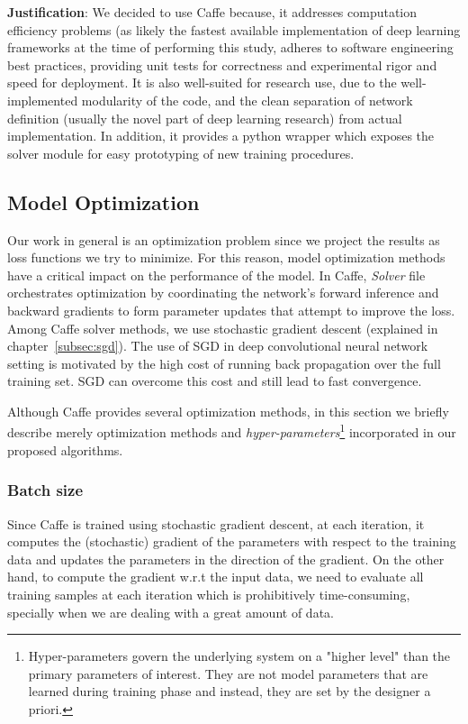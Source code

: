 \textbf{Justification}: We decided to use Caffe because, it addresses computation efficiency problems (as likely the fastest available implementation of deep learning frameworks at the time of performing this study, adheres to software engineering best practices, providing unit tests for correctness and experimental rigor and speed for deployment. It is also well-suited for research use, due to the well-implemented modularity of the code, and the clean separation of network definition (usually the novel part of deep learning research) from actual implementation\cite{jia2014caffe}. In addition, it provides a python wrapper which exposes the solver module for easy prototyping of new training procedures. 

\subsection{Model Optimization}

Our work in general is an optimization problem since we project the results as loss functions we try to minimize. For this reason, model optimization methods have a critical impact on the performance of the model. In Caffe, \textit{Solver} file orchestrates optimization by coordinating the network's forward inference and backward gradients to form parameter updates that attempt to improve the loss. Among Caffe solver methods, we use stochastic gradient descent (explained in chapter~\ref{subsec:sgd}). The use of SGD in deep convolutional neural network setting is motivated by the high cost of running back propagation over the full training set. SGD can overcome this cost and still lead to fast convergence. 

Although Caffe provides several optimization methods, in this section we briefly describe merely optimization methods and \textit{hyper-parameters}\footnote{Hyper-parameters govern the underlying system on a "higher level" than the primary parameters of interest. They are not model parameters that are learned during training phase and instead, they are set by the designer a priori.} incorporated in our proposed algorithms.


\subsubsection{Batch size}

Since Caffe is trained using stochastic gradient descent, at each iteration, it computes the (stochastic) gradient of the parameters with respect to the training data and updates the parameters in the direction of the gradient. On the other hand, to compute the gradient w.r.t the input data, we need to evaluate all training samples at each iteration which is prohibitively time-consuming, specially when we are dealing with a great amount of data. 


